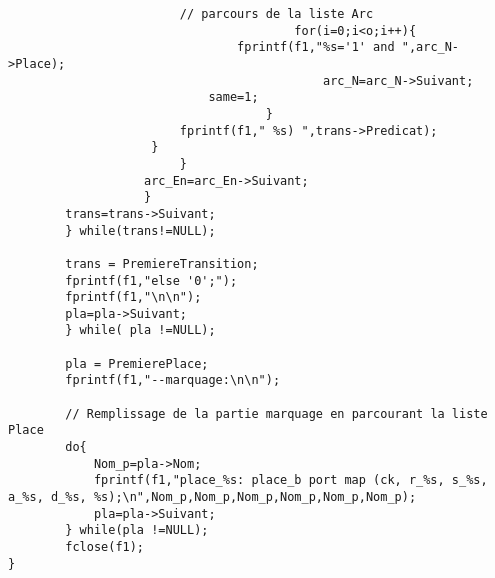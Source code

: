 \begin{appendices}
\begin{lstlisting}
						// parcours de la liste Arc
        	                     		for(i=0;i<o;i++){
				      			fprintf(f1,"%s='1' and ",arc_N->Place);
        	                      			arc_N=arc_N->Suivant;
							same=1;
        	                        }
				     	fprintf(f1," %s) ",trans->Predicat);                 
					}  
        	       		}
        	       arc_En=arc_En->Suivant;			  
        	       }                                    
		trans=trans->Suivant;
		} while(trans!=NULL); 
	
		trans = PremiereTransition;
		fprintf(f1,"else '0';");
		fprintf(f1,"\n\n");
		pla=pla->Suivant; 	
		} while( pla !=NULL);

		pla = PremierePlace;		
		fprintf(f1,"--marquage:\n\n");
		
		// Remplissage de la partie marquage en parcourant la liste Place
		do{
			Nom_p=pla->Nom;
			fprintf(f1,"place_%s: place_b port map (ck, r_%s, s_%s, a_%s, d_%s, %s);\n",Nom_p,Nom_p,Nom_p,Nom_p,Nom_p,Nom_p);
			pla=pla->Suivant;
		} while(pla !=NULL);
		fclose(f1);	
}	
	\end{lstlisting}
\end{appendices}